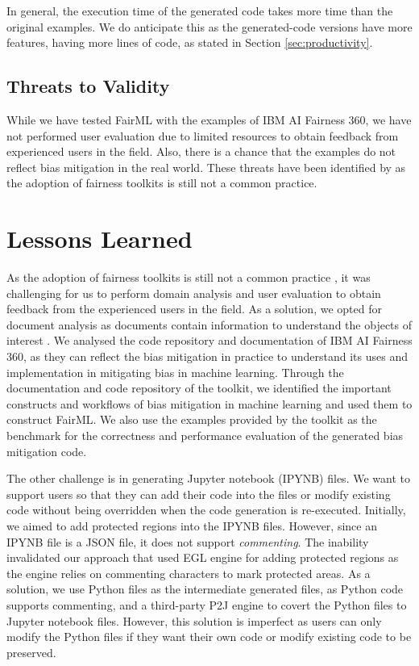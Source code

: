 \documentclass[sigconf,review]{acmart}
\begin{document}
	In general, the execution time of the generated code takes more time than the original examples. 
	We do anticipate this as the generated-code versions have more features, having more lines of code,
	as stated in Section \ref{sec:productivity}. 
	
	\subsection{Threats to Validity}
	\label{sec:threats_to_validity}
	While we have tested FairML with the examples of IBM AI Fairness 360, we have not performed user evaluation due to limited resources to obtain feedback from experienced users in the field. Also, there is a chance that the examples do not reflect bias mitigation in the real world. These threats have been identified by \cite{lee2021landscape} as the adoption of fairness toolkits is still not a common practice.
	
	\section{Lessons Learned}
	\label{sec:lessons_learned}
	As the adoption of fairness toolkits is still not a common practice \cite{lee2021landscape}, it was challenging for us to perform domain analysis and user evaluation to obtain feedback from the experienced users in the field. As a solution, we opted for document analysis as documents contain information to understand the objects of interest \cite{bowen2009document}. We analysed the code repository and documentation of IBM AI Fairness 360, as they can reflect the bias mitigation in practice to understand its uses and implementation in mitigating bias in machine learning. Through the documentation and code repository of the toolkit, we identified the important constructs and workflows of bias mitigation in machine learning and used them to construct FairML. We also use the examples provided by the toolkit as the benchmark for the correctness and performance evaluation of the generated bias mitigation code. 
	
	The other challenge is in generating Jupyter notebook (IPYNB) files. We want to support users so that they can add their code into the files or modify existing code without being overridden when the code generation is re-executed. Initially, we aimed to add protected regions into the IPYNB files. However, since an IPYNB file is a JSON file, it does not support \textit{commenting}. The inability invalidated our approach that used EGL engine \cite{rose2008egl} for adding protected regions as the engine relies on commenting characters to mark protected areas. As a solution, we use Python files as the intermediate generated files, as Python code supports commenting, and a third-party P2J engine to covert the Python files to Jupyter notebook files. However, this solution is imperfect as users can only modify the Python files if they want their own code or modify existing code to be preserved.
	
\end{document}
